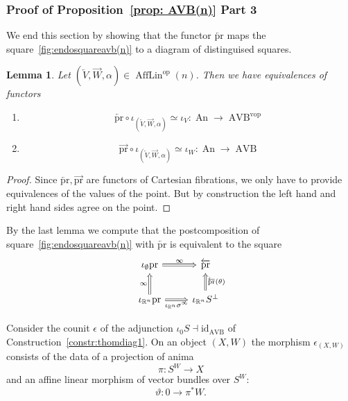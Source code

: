 \documentclass{article}
\newcommand{\R}{\mathbb{R}} %
\newcommand{\op}{\mathrm{op}}
\newcommand{\vop}{\mathrm{vop}}
\newcommand{\pr}{\mathrm{pr}}
\newcommand{\id}{\mathrm{id}}
\DeclareMathOperator{\AVB}{AVB}
\DeclareMathOperator{\An}{An}
\DeclareMathOperator{\AffLin}{AffLin}
\newtheorem{lemma}{Lemma}
\begin{document}
\subsubsection{Proof of Proposition~\ref{prop: AVB(n)} Part 3}
We end this section by showing that the functor $\overleftarrow{\pr}$ maps the square~\ref{fig:endosquareavb(n)}
to a diagram of distinguised squares.

\begin{lemma}
    Let $(\overleftarrow{V},\overrightarrow{W},\alpha) \in \AffLin^\op(n)$. Then we have equivalences of functors 
    \begin{enumerate}
        \item \[
            \overleftarrow{\pr} \circ \iota_{(\overleftarrow{V},\overrightarrow{W},\alpha)} \simeq \iota_V \colon \An \to \AVB^\vop
        \]
        \item \[
            \overrightarrow{\pr} \circ \iota_{(\overleftarrow{V},\overrightarrow{W},\alpha)} \simeq \iota_W \colon \An \to \AVB
        \]
        
    \end{enumerate}
\label{lemma:iotasagree}
\end{lemma}
\begin{proof}
    Since $\overleftarrow{\pr},\overrightarrow{\pr}$ are functors of Cartesian fibrations, we only have to provide equivalences 
    of the values of the point.
    But by construction the left hand and right hand sides agree on the point. 
\end{proof}

By the last lemma we compute that the postcomposition of square~\ref{fig:endosquareavb(n)} with $\overleftarrow{\pr}$ is equivalent 
to the square 
\[\begin{tikzcd}
	{\iota_{\emptyset}\pr} & {\overleftarrow{\pr}} \\
	{\iota_{\R^n}\pr} & {\iota_{\R^n}S^\perp}
	\arrow["\infty", Rightarrow, from=2-1, to=1-1]
	\arrow["\infty", Rightarrow, from=1-1, to=1-2]
	\arrow["{\iota_{\R^n}\sigma^\infty}"', Rightarrow, from=2-1, to=2-2]
	\arrow["{\overleftarrow{\pr}(\theta)}"', Rightarrow, from=2-2, to=1-2]
\end{tikzcd}\]

Consider the counit $\epsilon$ of the adjunction $\iota_0 S \dashv \id_{\AVB}$ of Construction~\ref{constr:thomdiag1}.
On an object $(X,W)$ the morphism $\epsilon_{(X,W)}$ consists of the data of a projection of anima 
\[
\pi \colon S^W \to X    
\]
and an affine linear morphism of vector bundles over $S^W$:
\[
\vartheta \colon 0 \to \pi^*W.    
\]
\end{document}
